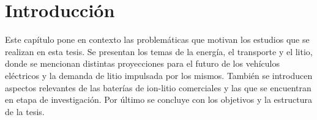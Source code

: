 \chapter{Introducción}\label{ch:introduccion}
\thispagestyle{empty}

\vspace{50pt}

\begin{adjustwidth}{50pt}{50pt}
    Este capítulo pone en contexto las problemáticas que motivan los estudios
    que se realizan en esta tesis. Se presentan los temas de la energía, el 
    transporte y el litio, donde se mencionan distintas proyecciones para el 
    futuro de los vehículos eléctricos y la demanda de litio impulsada por 
    los mismos. También se introducen aspectos relevantes de las baterías de
    ion-litio comerciales y las que se encuentran en etapa de investigación.
    Por último se concluye con los objetivos y la estructura de la tesis.
\end{adjustwidth}

\clearpage
\newpage
\thispagestyle{empty}
\mbox{}
\newpage








